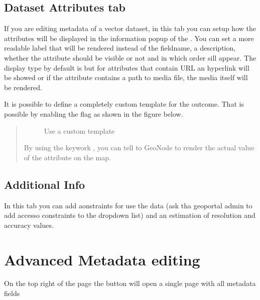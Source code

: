 \documentclass[letterpaper,10pt,english]{sphinxmanual}
\begin{document}
\subsection{Dataset Attributes tab}
\label{\detokenize{03_managing_metadata:dataset-attributes-tab}}
\sphinxAtStartPar
If you are editing metadata of a vector dataset, in this tab you can setup
how the attributes will be displayed in the information popup of the .
You can set a more readable label that will be rendered instead of the fieldname, a description,
whether the attribute should be visible or not and in which order sill appear.
The display type by default is  but for attributes that contain URL an hyperlink will be showed
or if the attribute contains a path to media file, the media itself will be rendered.

\sphinxAtStartPar
It is possible to define a completely custom  template for the  outcome.
That is possible by enabling the  flag as shown in the figure below.
\begin{quote}

\begin{figure}[htbp]
\centering
\capstart

\noindent{}
\caption{Use a custom template}\label{\detokenize{03_managing_metadata:id8}}\end{figure}

\sphinxAtStartPar
By using the keywork , you can tell to GeoNode to render the actual value of the attribute on the map.
\end{quote}


\subsection{Additional Info}
\label{\detokenize{03_managing_metadata:additional-info}}
\sphinxAtStartPar
In this tab you can add aonstraints for use the data
(ask tha geoportal admin to add accesso constraints to the dropdown list) and an estimation
of resolution and accuracy values.


\section{Advanced Metadata editing}
\label{\detokenize{03_managing_metadata:advanced-metadata-editing}}
\sphinxAtStartPar
On the top right of the page the button  will open a single page
with all metadata fields
\end{document}
